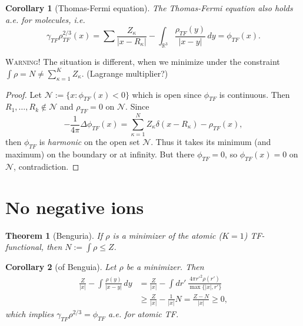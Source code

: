\documentclass[11pt]{amsart}
\newcommand{\R}{\mathbb{R}}
\newtheorem{thm}{Theorem}
\newtheorem{cor}{Corollary}
\theoremstyle{definition}
\theoremstyle{definition}
\theoremstyle{definition}
\numberwithin{equation}{section}
\begin{document}
\begin{cor}[Thomas-Fermi equation]\label{thm:euler-lagrange}
The Thomas-Fermi equation also holds a.e. for molecules, i.e.
\begin{equation}\label{eqn:euler-lagrange}
\gamma_{TF}\rho_{TF}^{2/3}(x)=\sum\frac{Z_\kappa}{|x-R_\kappa|}-\int_{\R^3}\frac{\rho_{TF}(y)}{|x-y|}\,dy=\phi_{TF}(x).
\end{equation}
\end{cor}
\noindent\textsc{Warning!} The situation is different, when we minimize under the constraint $\int\rho=N\ne\sum_{\kappa=1}^{K}Z_\kappa$. (Lagrange multiplier?) %
\begin{proof}
Let $\mathcal{N}:=\{x:\phi_{TF}(x)<0\}$ which is open since $\phi_{TF}$ is continuous. Then $R_1,\ldots,R_k\not\in\mathcal{N}$ and $\rho_{TF}=0$ on $\mathcal{N}$. Since
\[
-\frac{1}{4\pi}\Delta\phi_{TF}(x)=\sum_{\kappa=1}^{N}Z_\kappa\delta(x-R_\kappa)-\rho_{TF}(x),
\]
then $\phi_{TF}$ is \emph{harmonic} on the open set $\mathcal{N}$. Thus it takes its minimum (and maximum) on the boundary or at infinity. But there $\phi_{TF}=0$, so $\phi_{TF}(x)=0$ on $\mathcal{N}$, contradiction.
\end{proof}


\section{No negative ions}
\begin{thm}[Benguria]
If $\rho$ is a minimizer of the atomic ($K=1$) TF-functional, then $N:=\int\rho\le Z$.
\end{thm}

\begin{cor}[of Benguia]
Let $\rho$ be a minimizer. Then
\begin{align*}
\frac{Z}{|x|}-\int\frac{\rho(y)}{|x-y|}\,dy&=\frac{Z}{|x|}-\int dr'\,\frac{4\pi r'^2\rho(r')}{\max\{|x|,r'\}}\\
&\ge\frac{Z}{|x|}-\frac{1}{|x|}N=\frac{Z-N}{|x|}\ge0,
\end{align*}
which implies $\gamma_{TF}\rho^{2/3}=\phi_{TF}$ a.e. for atomic TF.
\end{cor} %
\end{document}

